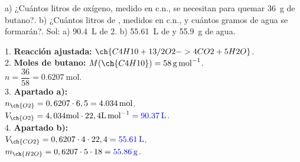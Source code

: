 \begin{exercise}
    a) ¿Cuántos litros de oxígeno, medido en c.n., se necesitan para quemar \qty{36}{\g} de butano?. b) ¿Cuántos litros de , medidos en c.n., y cuántos gramos de agua se formarán?. Sol: a) \qty{90.4}{\L} de 2. b) \qty{55.61}{\L} de  y \qty{55.9}{\g} de agua.
    \begin{solu}
        1. \textbf{Reacción ajustada:} \( \ch{C4H10 + 13/2 O2 -> 4 CO2 + 5 H2O} \). \\
        2. \textbf{Moles de butano:} \( M(\ch{C4H10}) = \qty{58}{\g\per\mol} \). \\
        \( n = \dfrac{36}{58} = \qty{0,6207}{\mol} \). \\
        3. \textbf{Apartado a):} \\
        \( n_{\ch{O2}} = 0,6207 \cdot 6,5 = \qty{4,034}{\mol} \). \\
        \( V_{\ch{O2}} = 4,034 \si{\mol} \cdot 22,4 \si{\L\per\mol} = \textbf{\textcolor{blue}{\qty{90,37}{\L}}} \). \\
        4. \textbf{Apartado b):} \\
        \( V_{\ch{CO2}} = 0,6207 \cdot 4 \cdot 22,4 = \textbf{\textcolor{blue}{\qty{55,61}{\L}}} \). \\
        \( m_{\ch{H2O}} = 0,6207 \cdot 5 \cdot 18 = \textbf{\textcolor{blue}{\qty{55,86}{\g}}} \).
    \end{solu}

\end{exercise}

